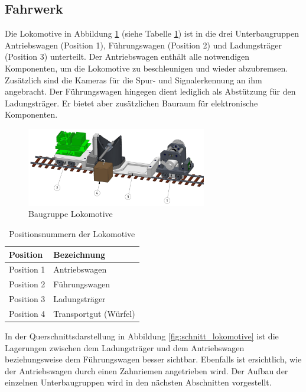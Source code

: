 \documentclass[../../main.tex]{subfiles}
\begin{document}
    \subsection{Fahrwerk}
    Die Lokomotive in Abbildung \ref{fig:bg_lokomotive} (siehe Tabelle \ref{tab:bg_lokomotive}) ist in die drei Unterbaugruppen Antriebswagen (Position 1), Führungswagen (Position 2) und Ladungsträger (Position 3) unterteilt. Der Antriebswagen enthält alle notwendigen Komponenten, um die Lokomotive zu beschleunigen und wieder abzubremsen. Zusätzlich sind die Kameras für die Spur- und Signalerkennung an ihm angebracht. Der Führungswagen hingegen dient lediglich als Abstützung für den Ladungsträger. Er bietet aber zusätzlichen Bauraum für elektronische Komponenten.\\

    \begin{figure}[H] %
        \centering
        \includegraphics[width=0.7\textwidth]{Lokomotive.png}
        \caption{Baugruppe Lokomotive}
        \label{fig:bg_lokomotive}
    \end{figure}

    \begin{table}[H] \centering
        \begin{tabular}{|l|l|}
        \hline
        \textbf{Position} & \textbf{Bezeichnung}\\
        \hline
        Position 1          & Antriebswagen\\
         \hline
        Position 2          & Führungswagen\\
        \hline
        Position 3          & Ladungsträger\\
        \hline
        Position 4          & Transportgut (Würfel)\\
        \hline
        \end{tabular}

        \caption{Positionsnummern der Lokomotive}
        \label{tab:bg_lokomotive}
    \end{table}

    In der Querschnittsdarstellung in Abbildung \ref{fig:schnitt_lokomotive} ist die Lagerungen zwischen dem Ladungsträger und dem Antriebswagen beziehungsweise dem Führungswagen besser sichtbar. Ebenfalls ist ersichtlich, wie der Antriebswagen durch einen Zahnriemen angetrieben wird. Der Aufbau der einzelnen Unterbaugruppen wird in den nächsten Abschnitten vorgestellt.\\
\end{document}
